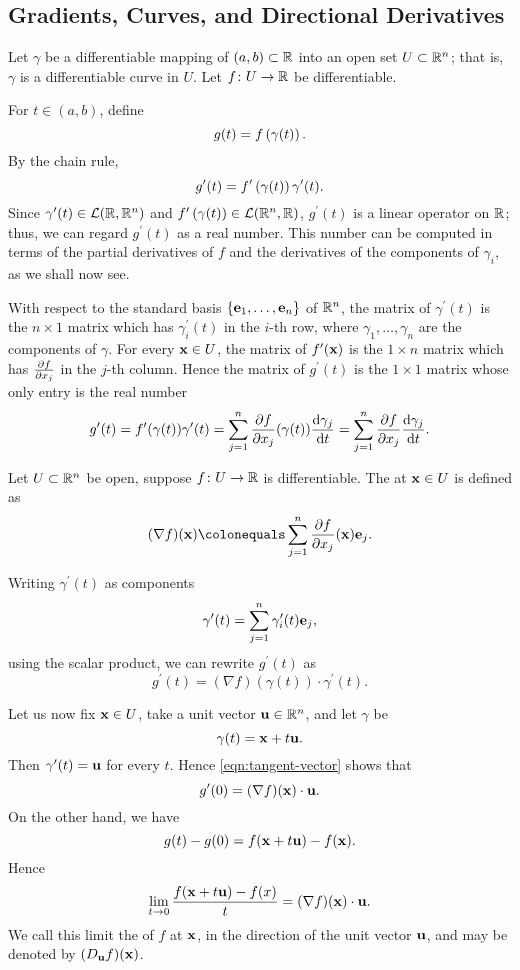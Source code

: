 \subsection{Gradients, Curves, and Directional Derivatives}
Let $\gamma$ be a differentiable mapping of $(a,b)\subset\mathbb R$ into an open set $U\subset\mathbb R^n$; that is, $\gamma$ is a differentiable curve in $U$. Let $f\colon U\to\mathbb R$ be differentiable.

For $t\in(a,b)$, define
\[g(t)=f\left(\gamma(t)\right).\]
By the chain rule,
\[g^\prime(t)=f^\prime\left(\gamma(t)\right)\gamma^\prime(t).\]
Since $\gamma^\prime(t)\in\mathcal{L}(\mathbb R,\mathbb R^n)$ and $f^\prime\left(\gamma(t)\right)\in\mathcal{L}(\mathbb R^n,\mathbb R)$, $g^\prime(t)$ is a linear operator on $\mathbb R$; thus, we can regard $g^\prime(t)$ as a real number. 
This number can be computed in terms of the partial derivatives of $f$ and the derivatives of the components of $\gamma_i$, as we shall now see.

With respect to the standard basis $\{\vb{e}_1,\dots,\vb{e}_n\}$ of $\mathbb R^n$, the matrix of $\gamma^\prime(t)$ is the $n\times1$ matrix which has $\gamma_i^\prime(t)$ in the $i$-th row, where $\gamma_1,\dots,\gamma_n$ are the components of $\gamma$. 
For every $\vb{x}\in U$, the matrix of $f^\prime(\vb{x})$ is the $1\times n$ matrix which has $\pdv{f}{x_j}$ in the $j$-th column. 
Hence the matrix of $g^\prime(t)$ is the $1\times1$ matrix whose only entry is the real number
\[g^\prime(t)=f^\prime(\gamma(t))\gamma^\prime(t)=\sum_{j=1}^{n}\pdv{f}{x_j}(\gamma(t))\dv{\gamma_j}{t}(t)=\sum_{j=1}^{n}\pdv{f}{x_j}\dv{\gamma_j}{t}.\]

\begin{definition}[Gradient]
Let $U\subset\mathbb R^n$ be open, suppose $f\colon U\to\mathbb R$ is differentiable. The  at $\vb{x}\in U$ is defined as
\begin{equation}
(\nabla f)(\vb{x})\colonequals\sum_{j=1}^{n}\pdv{f}{x_j}(\vb{x})\vb{e}_j.
\end{equation}
\end{definition}

Writing $\gamma^\prime(t)$ as components
\[\gamma^\prime(t)=\sum_{j=1}^{n}\gamma_i^\prime(t)\vb{e}_j,\]
using the scalar product, we can rewrite $g^\prime(t)$ as
\begin{equation}\label{eqn:tangent-vector}
g^\prime(t)=(\nabla f)(\gamma(t))\cdot\gamma^\prime(t).
\end{equation}

Let us now fix $\vb{x}\in U$, take a unit vector $\vb{u}\in\mathbb R^n$, and let $\gamma$ be
\[\gamma(t)=\vb{x}+t\vb{u}.\]
Then $\gamma^\prime(t)=\vb{u}$ for every $t$. Hence \eqref{eqn:tangent-vector} shows that
\[g^\prime(0)=(\nabla f)(\vb{x})\cdot\vb{u}.\]
On the other hand, we have
\[g(t)-g(0)=f(\vb{x}+t\vb{u})-f(\vb{x}).\]
Hence
\begin{equation}\label{eqn:directional-derivative}
\lim_{t\to0}\frac{f(\vb{x}+t\vb{u})-f(x)}{t}=(\nabla f)(\vb{x})\cdot\vb{u}.
\end{equation}
We call this limit the  of $f$ at $\vb{x}$, in the direction of the unit vector $\vb{u}$, and may be denoted by $(D_{\vb{u}}f)(\vb{x})$.

